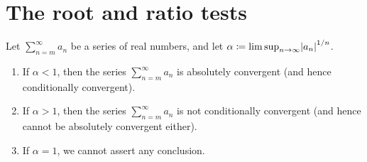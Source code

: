 \section{The root and ratio tests}\label{sec 7.5}

\begin{theorem}\label{7.5.1}
    Let \(\sum_{n = m}^\infty a_n\) be a series of real numbers, and let \(\alpha \coloneqq \limsup_{n \to \infty} \abs*{a_n}^{1 / n}\).
    \begin{enumerate}
        \item If \(\alpha < 1\), then the series \(\sum_{n = m}^\infty a_n\) is absolutely convergent
              (and hence conditionally convergent).
        \item If \(\alpha > 1\), then the series \(\sum_{n = m}^\infty a_n\) is not conditionally convergent
              (and hence cannot be absolutely convergent either).
        \item If \(\alpha = 1\), we cannot assert any conclusion.
    \end{enumerate}
\end{theorem}

